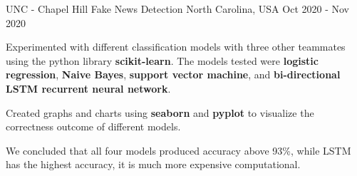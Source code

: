 

\begin{cventries}

  \cventry
    {UNC - Chapel Hill} %
    {Fake News Detection} %
    {North Carolina, USA} %
    {Oct 2020 - Nov 2020} %
    {
      \begin{cvitems} %
        \item {Experimented with different classification models with three other teammates using the python library \textbf{scikit-learn}. The models tested were \textbf{logistic regression}, \textbf{Naive Bayes}, \textbf{support vector machine}, and \textbf{bi-directional LSTM recurrent neural network}.}
        \item {Created graphs and charts using \textbf{seaborn} and \textbf{pyplot} to visualize the correctness outcome of different models.}
        \item {We concluded that all four models produced accuracy above 93\%, while LSTM has the highest accuracy, it is much more expensive computational.}
      \end{cvitems}
    }


\end{cventries}
